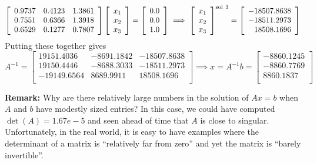 $$\left[
\begin{array}{ccc}
0.9737 & 0.4123 & 1.3861 \\
0.7551 & 0.6366 & 1.3918 \\
0.6529 & 0.1277 & 0.7807 \\
\end{array}
\right] \left[
\begin{array}{c}
x_1\\x_2\\x_3
\end{array}
\right] = \left[
\begin{array}{c}
0.0\\
0.0 \\
1.0\\
\end{array}
\right] \implies \left[
\begin{array}{c}
x_1\\x_2\\x_3
\end{array}
\right]^{\rm sol~3}= \left[
\begin{array}{r}
-18507.8638 \\
-18511.2973 \\
18508.1696 \\
\end{array}
\right]$$
Putting these together gives
$$
A^{-1}=\left[
\begin{array}{rrr}
19151.4036 & -8691.1842 & -18507.8638 \\
19150.4446 & -8688.3033 & -18511.2973 \\
-19149.6564 & 8689.9911 & 18508.1696 \\
\end{array}
\right] \implies x = A^{-1} b = \left[
\begin{array}{r}
-8860.1245 \\
-8860.7769 \\
8860.1837 \\
\end{array}
\right]
$$

\noindent \textbf{Remark:} Why are there relatively large numbers in the solution of $Ax=b$ when  $A$ and $b$ have modestly sized entries? In this case, we could have computed $\det(A) = 1.67e-5$ and seen ahead of time that $A$ is close to singular. Unfortunately, in the real world, it is easy to have examples where the determinant of a matrix is ``relatively far from zero'' and yet the matrix is ``barely invertible''. 

\Qed

